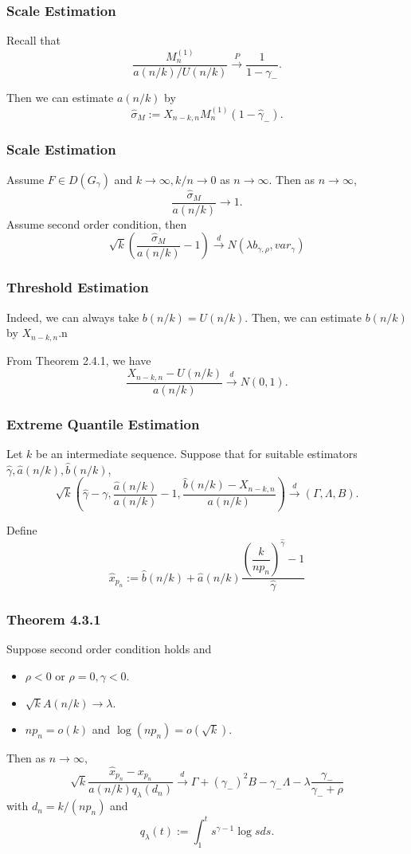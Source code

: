\documentclass{beamer}
\begin{document}
\begin{frame}
    \frametitle{Scale Estimation}
Recall that
$$
\dfrac{M_n^{(1)}}{a(n/k)/U(n/k)}\stackrel{P}{\to} \dfrac{1}{1-\gamma_{-}}.
$$

Then we can estimate $a(n/k)$ by
$$
\hat{\sigma}_M:=X_{n-k,n}M_n^{(1)}(1-\hat{\gamma}_{-}).
$$
\end{frame}


\begin{frame}
    \frametitle{Scale Estimation}
    Assume $F\in D(G_{\gamma})$ and $k\to \infty, k/n \to 0$ as $n\to \infty$. Then as $n \to \infty$, 
    $$
    \dfrac{\hat{\sigma}_M}{a(n/k)}\to 1.
    $$
    Assume second order condition, then 
    $$
\sqrt{k}\left(\dfrac{\hat{\sigma}_M}{a(n/k)}-1\right) \stackrel{d}{\to} N(\lambda b_{\gamma,\rho},var_{\gamma})
    $$

\end{frame}

\begin{frame}
    \frametitle{Threshold Estimation}
Indeed, we can always take $b(n/k)=U(n/k)$. Then, we can estimate $b(n/k)$ by $X_{n-k,n}$.n

From Theorem 2.4.1, we have
$$
\dfrac{X_{n-k,n}-U(n/k)}{a(n/k)}\stackrel{d}{\to} N(0,1).
$$
    

\end{frame}


\begin{frame}
    \frametitle{Extreme Quantile Estimation}
    Let $k$ be an intermediate sequence. Suppose that for suitable estimators $\hat{\gamma}, \hat{a}(n/k), \hat{b}(n/k)$,
    $$
\sqrt{k}\left(\hat{\gamma}-\gamma,\dfrac{\hat{a}(n/k)}{a(n/k)}-1,\dfrac{\hat{b}(n/k)-X_{n-k,n}}{a(n/k)}\right)\stackrel{d}{\to}(\Gamma,\Lambda,B).
    $$

Define
$$
\hat{x}_{p_n}:=\hat{b}(n/k)+\hat{a}(n/k)\dfrac{\left(\dfrac{k}{np_n}\right)^{\hat{\gamma}}-1}{\hat{\gamma}}
$$
    

\end{frame}

\begin{frame}
    \frametitle{Theorem 4.3.1}
    Suppose second order condition holds and 
\begin{itemize}
    \item $\rho<0$ or $\rho=0,\gamma<0$.
    \item $\sqrt{k}A(n/k) \to \lambda$.
    \item $np_n=o(k)$ and $\log(np_n)=o(\sqrt{k})$.
\end{itemize}
Then as $n \to \infty$,
$$
\sqrt{k} \dfrac{\hat{x}_{p_n}-x_{p_n}}{a(n/k)q_{\lambda}(d_n)} \stackrel{d}{\to} \Gamma + (\gamma_{-})^2B -{\gamma_{-}}\Lambda -\lambda \dfrac{\gamma_{-}}{\gamma_{-}+\rho}
$$
with $d_n=k/(np_n)$ and 
$$
q_{\lambda}(t):=\int_{1}^{t}s^{\gamma-1}\log s ds.
$$
\end{frame}
\end{document}
